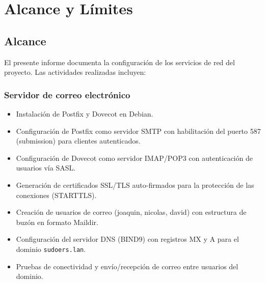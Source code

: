 
\section{Alcance y Límites}

\subsection{Alcance}

El presente informe documenta la configuración de los servicios de red del
proyecto. Las actividades realizadas incluyen:

\subsubsection{Servidor de correo electrónico}
\begin{itemize}
  \item Instalación de Postfix y Dovecot en Debian.
  \item Configuración de Postfix como servidor SMTP con habilitación del
        puerto 587 (submission) para clientes autenticados.
  \item Configuración de Dovecot como servidor IMAP/POP3 con autenticación
        de usuarios vía SASL.
  \item Generación de certificados SSL/TLS auto-firmados para la protección
        de las conexiones (STARTTLS).
  \item Creación de usuarios de correo (joaquin, nicolas, david) con
        estructura de buzón en formato Maildir.
  \item Configuración del servidor DNS (BIND9) con registros MX y A para
        el dominio \texttt{sudoers.lan}.
  \item Pruebas de conectividad y envío/recepción de correo entre usuarios
        del dominio.
\end{itemize}

